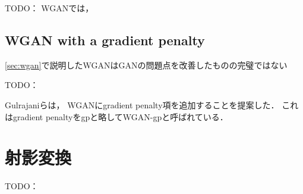 \documentclass[\homedir/main.tex]{subfiles}
\begin{document}
TODO：
WGANでは，

\subsection{WGAN with a gradient penalty}\label{sec:wgan_gp}
\cref{sec:wgan}で説明したWGANはGANの問題点を改善したものの完璧ではない

TODO：

Gulrajaniら\cite{NIPS2017_892c3b1c}は，
WGANにgradient penalty項を追加することを提案した．
これはgradient penaltyをgpと略してWGAN-gpと呼ばれている．

\section{射影変換}\label{sec:projective_transformation}

TODO：

\printBibForSubfiles
\end{document}
